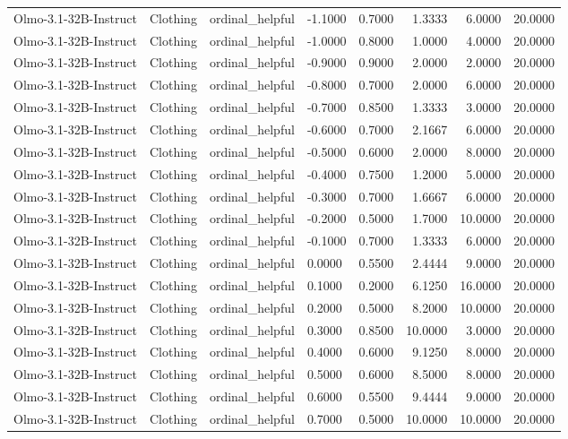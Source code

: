 \begin{table}
\begin{tabular}{llllrrrr}
Olmo-3.1-32B-Instruct & Clothing & ordinal_helpful & -1.1000 & 0.7000 & 1.3333 & 6.0000 & 20.0000 \\
Olmo-3.1-32B-Instruct & Clothing & ordinal_helpful & -1.0000 & 0.8000 & 1.0000 & 4.0000 & 20.0000 \\
Olmo-3.1-32B-Instruct & Clothing & ordinal_helpful & -0.9000 & 0.9000 & 2.0000 & 2.0000 & 20.0000 \\
Olmo-3.1-32B-Instruct & Clothing & ordinal_helpful & -0.8000 & 0.7000 & 2.0000 & 6.0000 & 20.0000 \\
Olmo-3.1-32B-Instruct & Clothing & ordinal_helpful & -0.7000 & 0.8500 & 1.3333 & 3.0000 & 20.0000 \\
Olmo-3.1-32B-Instruct & Clothing & ordinal_helpful & -0.6000 & 0.7000 & 2.1667 & 6.0000 & 20.0000 \\
Olmo-3.1-32B-Instruct & Clothing & ordinal_helpful & -0.5000 & 0.6000 & 2.0000 & 8.0000 & 20.0000 \\
Olmo-3.1-32B-Instruct & Clothing & ordinal_helpful & -0.4000 & 0.7500 & 1.2000 & 5.0000 & 20.0000 \\
Olmo-3.1-32B-Instruct & Clothing & ordinal_helpful & -0.3000 & 0.7000 & 1.6667 & 6.0000 & 20.0000 \\
Olmo-3.1-32B-Instruct & Clothing & ordinal_helpful & -0.2000 & 0.5000 & 1.7000 & 10.0000 & 20.0000 \\
Olmo-3.1-32B-Instruct & Clothing & ordinal_helpful & -0.1000 & 0.7000 & 1.3333 & 6.0000 & 20.0000 \\
Olmo-3.1-32B-Instruct & Clothing & ordinal_helpful & 0.0000 & 0.5500 & 2.4444 & 9.0000 & 20.0000 \\
Olmo-3.1-32B-Instruct & Clothing & ordinal_helpful & 0.1000 & 0.2000 & 6.1250 & 16.0000 & 20.0000 \\
Olmo-3.1-32B-Instruct & Clothing & ordinal_helpful & 0.2000 & 0.5000 & 8.2000 & 10.0000 & 20.0000 \\
Olmo-3.1-32B-Instruct & Clothing & ordinal_helpful & 0.3000 & 0.8500 & 10.0000 & 3.0000 & 20.0000 \\
Olmo-3.1-32B-Instruct & Clothing & ordinal_helpful & 0.4000 & 0.6000 & 9.1250 & 8.0000 & 20.0000 \\
Olmo-3.1-32B-Instruct & Clothing & ordinal_helpful & 0.5000 & 0.6000 & 8.5000 & 8.0000 & 20.0000 \\
Olmo-3.1-32B-Instruct & Clothing & ordinal_helpful & 0.6000 & 0.5500 & 9.4444 & 9.0000 & 20.0000 \\
Olmo-3.1-32B-Instruct & Clothing & ordinal_helpful & 0.7000 & 0.5000 & 10.0000 & 10.0000 & 20.0000 \\

\end{tabular}
\end{table}
